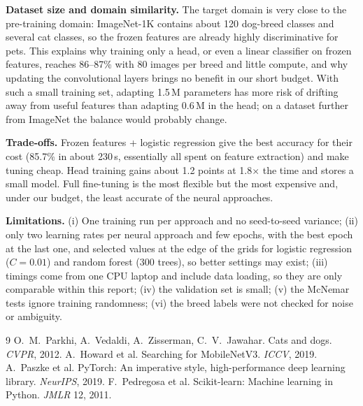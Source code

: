 \documentclass[10pt,a4paper]{article}
\begin{document}
\textbf{Dataset size and domain similarity.} The target domain is very close to the pre-training domain: ImageNet-1K contains about 120 dog-breed classes and several cat classes, so the frozen features are already highly discriminative for pets. This explains why training only a head, or even a linear classifier on frozen features,
reaches 86--87\% with 80 images per breed and little compute, and why updating the convolutional layers brings no benefit in our short budget. With such a small training set, adapting 1.5\,M parameters has more risk of drifting away from useful features than adapting 0.6\,M in the head; on a dataset further from ImageNet the balance would probably change.

\textbf{Trade-offs.} Frozen features + logistic regression give the best accuracy for their cost (85.7\% in about 230\,s, essentially all spent on feature extraction) and make tuning cheap. Head training gains about 1.2 points at 1.8$\times$ the time and stores a small model.
Full fine-tuning is the most flexible but the most expensive and, under our budget, the least accurate of the neural approaches.

\textbf{Limitations.} (i) One training run per approach and no seed-to-seed variance; (ii) only two learning rates per neural approach and few epochs, with the best epoch at the last one, and selected values at the edge of the grids for logistic regression ($C=0.01$) and random forest (300 trees), so better settings may exist; (iii) timings come from one CPU laptop and include data loading, so they are only comparable within this report; (iv) the validation set is small; (v) the McNemar tests ignore training randomness; (vi) the breed labels were not checked for noise or ambiguity.

\begin{thebibliography}{9}\small
{} O.~M.~Parkhi, A.~Vedaldi, A.~Zisserman, C.~V.~Jawahar. Cats and dogs. \emph{CVPR}, 2012.
 A.~Howard et al. Searching for MobileNetV3. \emph{ICCV}, 2019.
 A.~Paszke et al. PyTorch: An imperative style, high-performance deep learning library. \emph{NeurIPS}, 2019.
 F.~Pedregosa et al. Scikit-learn: Machine learning in Python. \emph{JMLR} 12, 2011.
\end{thebibliography}
\end{document}
